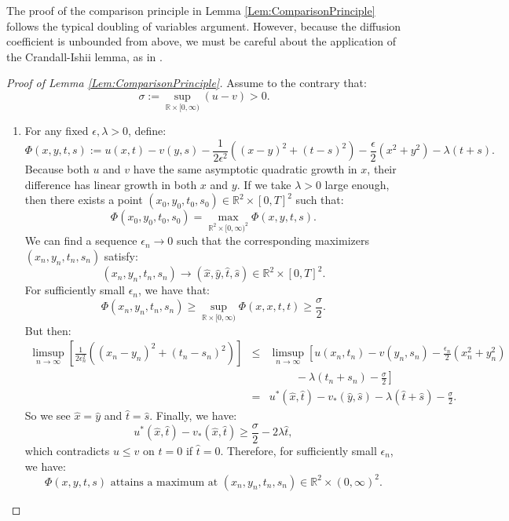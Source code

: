 \documentclass[11pt]{article}
\begin{document}
The proof of the comparison principle in Lemma \ref{Lem:ComparisonPrinciple} follows the typical doubling of variables argument. However, because the diffusion coefficient is unbounded from above, we must be careful about the application of the Crandall-Ishii lemma, as in \cite{DaLioLey2010}.

\begin{proof}[Proof of Lemma \ref{Lem:ComparisonPrinciple}]
Assume to the contrary that:
\[\sigma := \sup\limits_{\mathbb{R}\times[0,\infty)}\left(u-v\right) > 0.\]
\begin{enumerate}
\item For any fixed $\epsilon,\lambda >0$, define:
\[\Phi(x,y,t,s) := u(x,t)-v(y,s)-\frac{1}{2\epsilon^2}\left((x-y)^2+(t-s)^2\right)-\frac{\epsilon}{2}(x^2+y^2)-\lambda(t+s).\]
Because both $u$ and $v$ have the same asymptotic quadratic growth in $x$, their difference has linear growth in both $x$ and $y$. If we take $\lambda>0$ large enough, then there exists a point $(x_0,y_0,t_0,s_0)\in\mathbb{R}^2\times[0,T]^2$ such that:
\[\Phi(x_0,y_0,t_0,s_0) = \max\limits_{\mathbb{R}^2\times[0,\infty)^2}\Phi(x,y,t,s).\]
We can find a sequence $\epsilon_n\to 0$ such that the corresponding maximizers $(x_n,y_n,t_n,s_n)$ satisfy:
\[(x_n,y_n,t_n,s_n)\to(\hat{x},\hat{y},\hat{t},\hat{s})\in\mathbb{R}^2\times[0,T]^2.\]
For sufficiently small $\epsilon_n$, we have that:
\[\Phi(x_n,y_n,t_n,s_n)\geq\sup\limits_{\mathbb{R}\times[0,\infty)}\Phi(x,x,t,t)\geq\frac{\sigma}{2}.\]
But then:
\begin{eqnarray}
\limsup\limits_{n\to\infty}\left[\frac{1}{2\epsilon_n^2}\left((x_n-y_n)^2+(t_n-s_n)^2\right)\right]&\leq &\limsup\limits_{n\to\infty}\left[u(x_n,t_n)-v(y_n,s_n)-\frac{\epsilon_n}{2}(x_n^2+y_n^2)\right.\nonumber\\
& & \left.\hspace{1cm}-\lambda(t_n+s_n)-\frac{\sigma}{2}\right]\nonumber\\
& = & u^*(\hat{x},\hat{t})-v_*(\hat{y},\hat{s})-\lambda(\hat{t}+\hat{s})-\frac{\sigma}{2}.\nonumber
\end{eqnarray}
So we see $\hat{x}=\hat{y}$ and $\hat{t}=\hat{s}$. Finally, we have:
\[u^*(\hat{x},\hat{t})-v_*(\hat{x},\hat{t})\geq\frac{\sigma}{2}-2\lambda\hat{t},\]
which contradicts $u\leq v$ on $t=0$ if $\hat{t}=0$. Therefore, for sufficiently small $\epsilon_n$, we have:
\[\Phi(x,y,t,s)\text{ attains a maximum at }(x_n,y_n,t_n,s_n)\in\mathbb{R}^2\times(0,\infty)^2.\]


\end{enumerate}
\end{proof}
\end{document}

